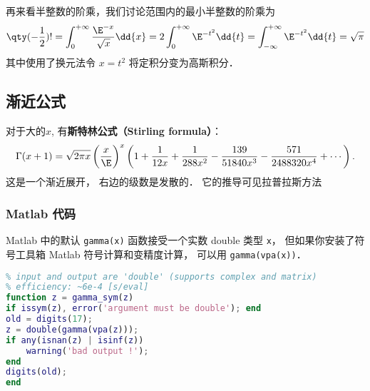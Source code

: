 再来看半整数的阶乘，我们讨论范围内的最小半整数的阶乘为 
\begin{equation}
\qty(-\frac12) ! = \int_0^{+\infty} \frac{\E^{-x}}{\sqrt x}\dd{x} = 2\int_0^{+\infty} \E^{-t^2} \dd{t} = \int_{-\infty}^{+\infty} \E^{-t^2} \dd{t} = \sqrt{\pi}
\end{equation}
其中使用了换元法令 $x = t^2$ 将定积分变为高斯积分．

\subsection{渐近公式}
对于大的$x$, 有\textbf{斯特林公式（Stirling formula）}：
$$
\Gamma(x+1)
  =\sqrt{2\pi x}\left({x\over \E}\right)^x
  \left(
   1
   +{1\over12x}
   +{1\over288x^2}
   -{139\over51840x^3}
   -{571\over2488320x^4}
   + \cdots
  \right).
$$
这是一个渐近展开， 右边的级数是发散的． 它的推导可见拉普拉斯方法

\subsubsection{Matlab 代码}
Matlab 中的默认 \verb|gamma(x)| 函数接受一个实数 double 类型 \verb|x|， 但如果你安装了符号工具箱 Matlab 符号计算和变精度计算， 可以用 \verb|gamma(vpa(x))|．
\begin{lstlisting}[language=matlab]
% symbolic implementation of gamma function
% input and output are 'double' (supports complex and matrix)
% efficiency: ~6e-4 [s/eval]
function z = gamma_sym(z)
if issym(z), error('argument must be double'); end
old = digits(17);
z = double(gamma(vpa(z)));
if any(isnan(z) | isinf(z))
    warning('bad output !');
end
digits(old);
end
\end{lstlisting}
